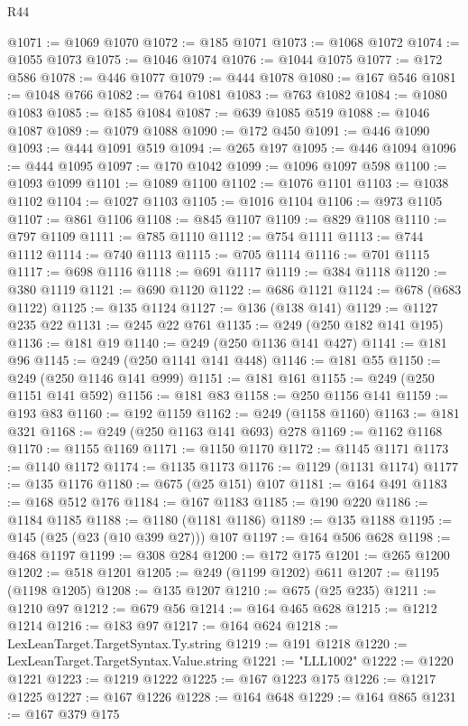 \begin{lexlean}{R44}
\begin{coremodule}
@1071 := @1069 @1070
@1072 := @185 @1071
@1073 := @1068 @1072
@1074 := @1055 @1073
@1075 := @1046 @1074
@1076 := @1044 @1075
@1077 := @172 @586
@1078 := @446 @1077
@1079 := @444 @1078
@1080 := @167 @546
@1081 := @1048 @766
@1082 := @764 @1081
@1083 := @763 @1082
@1084 := @1080 @1083
@1085 := @185 @1084
@1087 := @639 @1085 @519
@1088 := @1046 @1087
@1089 := @1079 @1088
@1090 := @172 @450
@1091 := @446 @1090
@1093 := @444 @1091 @519
@1094 := @265 @197
@1095 := @446 @1094
@1096 := @444 @1095
@1097 := @170 @1042
@1099 := @1096 @1097 @598
@1100 := @1093 @1099
@1101 := @1089 @1100
@1102 := @1076 @1101
@1103 := @1038 @1102
@1104 := @1027 @1103
@1105 := @1016 @1104
@1106 := @973 @1105
@1107 := @861 @1106
@1108 := @845 @1107
@1109 := @829 @1108
@1110 := @797 @1109
@1111 := @785 @1110
@1112 := @754 @1111
@1113 := @744 @1112
@1114 := @740 @1113
@1115 := @705 @1114
@1116 := @701 @1115
@1117 := @698 @1116
@1118 := @691 @1117
@1119 := @384 @1118
@1120 := @380 @1119
@1121 := @690 @1120
@1122 := @686 @1121
@1124 := @678 (@683 @1122)
@1125 := @135 @1124
@1127 := @136 (@138 @141)
@1129 := @1127 @235 @22
@1131 := @245 @22 @761
@1135 := @249 (@250 @182 @141 @195)
@1136 := @181 @19
@1140 := @249 (@250 @1136 @141 @427)
@1141 := @181 @96
@1145 := @249 (@250 @1141 @141 @448)
@1146 := @181 @55
@1150 := @249 (@250 @1146 @141 @999)
@1151 := @181 @161
@1155 := @249 (@250 @1151 @141 @592)
@1156 := @181 @83
@1158 := @250 @1156 @141
@1159 := @193 @83
@1160 := @192 @1159
@1162 := @249 (@1158 @1160)
@1163 := @181 @321
@1168 := @249 (@250 @1163 @141 @693) @278
@1169 := @1162 @1168
@1170 := @1155 @1169
@1171 := @1150 @1170
@1172 := @1145 @1171
@1173 := @1140 @1172
@1174 := @1135 @1173
@1176 := @1129 (@1131 @1174)
@1177 := @135 @1176
@1180 := @675 (@25 @151) @107
@1181 := @164 @491
@1183 := @168 @512 @176
@1184 := @167 @1183
@1185 := @190 @220
@1186 := @1184 @1185
@1188 := @1180 (@1181 @1186)
@1189 := @135 @1188
@1195 := @145 (@25 (@23 (@10 @399 @27))) @107
@1197 := @164 @506 @628
@1198 := @468 @1197
@1199 := @308 @284
@1200 := @172 @175
@1201 := @265 @1200
@1202 := @518 @1201
@1205 := @249 (@1199 @1202) @611
@1207 := @1195 (@1198 @1205)
@1208 := @135 @1207
@1210 := @675 (@25 @235)
@1211 := @1210 @97
@1212 := @679 @56
@1214 := @164 @465 @628
@1215 := @1212 @1214
@1216 := @183 @97
@1217 := @164 @624
@1218 := LexLeanTarget.TargetSyntax.Ty.string
@1219 := @191 @1218
@1220 := LexLeanTarget.TargetSyntax.Value.string
@1221 := "LLL1002"
@1222 := @1220 @1221
@1223 := @1219 @1222
@1225 := @167 @1223 @175
@1226 := @1217 @1225
@1227 := @167 @1226
@1228 := @164 @648
@1229 := @164 @865
@1231 := @167 @379 @175

\end{coremodule}
\end{lexlean}
